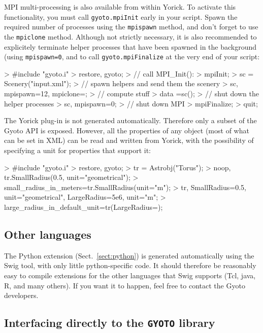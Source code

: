 \documentclass[a4paper,12pt]{article}
\begin{document}
MPI multi-processing is also available from within Yorick. To activate
this functionality, you must call \texttt{gyoto.mpiInit} early in your
script. Spawn the required number of processes using the
\texttt{mpispawn} method, and don't forget to use the
\texttt{mpiclone} method. Although not strictly necessary, it is also
recommended to explicitely terminate helper processes that have been
spawned in the background (using \texttt{mpispawn=0}, and to call
\texttt{gyoto.mpiFinalize} at the very end of your script:
\begin{code}
 > #include "gyoto.i"
 > restore, gyoto;
 > // call MPI_Init():
 > mpiInit;
 > sc = Scenery("input.xml");
 > // spawn helpers and send them the scenery
 > sc, mpispawn=12, mpiclone=;
 > // compute stuff
 > data =sc();
 > // shut down the helper processes
 > sc, mpispawn=0;
 > // shut down MPI
 > mpiFinalize;
 > quit;
\end{code}

The Yorick plug-in is not generated automatically. Therefore only a
subset of the Gyoto API is exposed. However, all the properties of any
object (most of what can be set in XML) can be read and written from
Yorick, with the possibility of specifying a unit for properties that
support it:
\begin{code}
 > #include "gyoto.i"
 > restore, gyoto;
 > tr = Astrobj("Torus");
 > noop, tr.SmallRadius(0.5, unit="geometrical");
 > small_radius_in_meters=tr.SmallRadius(unit="m");
 > tr, SmallRadius=0.5, unit="geometrical", LargeRadius=5e6, unit="m";
 > large_radius_in_default_unit=tr(LargeRadius=);
\end{code}


\subsection{Other languages}
\label{sect:swig}

The Python extension (Sect.~\ref{sect:python}) is generated
automatically using the Swig tool, with only little python-specific
code. It should therefore be reasonably easy to compile extensions for the
other languages that Swig supports (Tcl, java, R, and many others). If
you want it to happen, feel free to contact the Gyoto developers.

\subsection{Interfacing directly to the \texttt{GYOTO} library}
\end{document}
